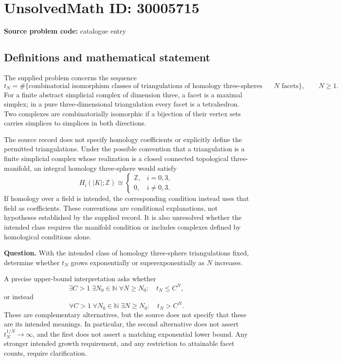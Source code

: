 \documentclass[11pt]{article}
\newcommand{\N}{\mathbb{N}}
\newcommand{\Z}{\mathbb{Z}}
\begin{document}
\section*{UnsolvedMath ID: 30005715}
\textbf{Source problem code:} catalogue entry
\subsection{Definitions and mathematical statement}
The supplied problem concerns the sequence
\[
 t_N=\#\{\text{combinatorial isomorphism classes of triangulations of homology three-spheres with }N\text{ facets}\},\qquad N\geq 1.
\]
For a finite abstract simplicial complex of dimension three, a facet is a maximal simplex; in a pure three-dimensional triangulation every facet is a tetrahedron. Two complexes are combinatorially isomorphic if a bijection of their vertex sets carries simplices to simplices in both directions.

The source record does not specify homology coefficients or explicitly define the permitted triangulations. Under the possible convention that a triangulation is a finite simplicial complex whose realization is a closed connected topological three-manifold, an integral homology three-sphere would satisfy
\[
 H_i(|K|;\Z)\cong
 \begin{cases}
 \Z,&i=0,3,\\
 0,&i\ne 0,3.
 \end{cases}
\]
If homology over a field is intended, the corresponding condition instead uses that field as coefficients. These conventions are conditional explanations, not hypotheses established by the supplied record. It is also unresolved whether the intended class requires the manifold condition or includes complexes defined by homological conditions alone.

\textbf{Question.} With the intended class of homology three-sphere triangulations fixed, determine whether \(t_N\) grows exponentially or superexponentially as \(N\) increases.

A precise upper-bound interpretation asks whether
\[
 \exists C>1\;\exists N_0\in\N\;\forall N\geq N_0:
 \quad t_N\leq C^N,
\]
or instead
\[
 \forall C>1\;\forall N_0\in\N\;\exists N\geq N_0:
 \quad t_N>C^N.
\]
These are complementary alternatives, but the source does not specify that these are its intended meanings. In particular, the second alternative does not assert \(t_N^{1/N}\to\infty\), and the first does not assert a matching exponential lower bound. Any stronger intended growth requirement, and any restriction to attainable facet counts, require clarification.
\end{document}
